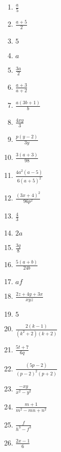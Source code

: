 {\begin{multicols}{3}
\begin{enumerate}[noitemsep, label=\textbf{\arabic*}. ] 
\item $\frac{a}{5}$%
\item $\frac{a + 5}{2}$%
\item $5$%
\item $a$%
\item $\frac{3a}{2}$%
\item $\frac{a + 3}{a + 2}$%
\item $\frac{a(3b + 1)}{b}$%
\item $\frac{4xy}{3}$%
\item $\frac{p(y - 2)}{3y}$%
\item $\frac{3(a + 3)}{98}$%
\item $\frac{4a^2(a - 5)}{6(a + 5)^2}$%
\item $\frac{(3x + 4)^2}{96p^2}$%
\item $\frac{4}{3}$%
\item $2a$%
\item $\frac{3q}{8}$%
\item $\frac{5(a + b)}{24b}$%
\item $af$%
\item $\frac{2z + 4y + 3x}{xyz}$%
\item $5$%
\item $\frac{2(k - 1)}{(k^2 + 2)(k + 2)}$%
\item $\frac{5t + 7}{6q}$%
\item $\frac{(5p - 2)}{(p - 2)^2(p+ 2)}$%
\item $\frac{-xy}{x^2 - y^2}$%
\item $\frac{m+1}{m^2 - mn + n^2}$%
\item $\frac{f}{h^3 - f^3}$%
\item $\frac{2x - 1}{6}$%
\end{enumerate}




\end{multicols}}
